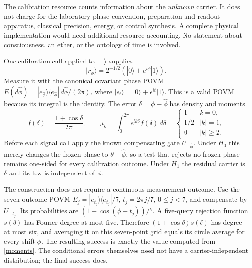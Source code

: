 \documentclass[11pt,a4paper]{article}
\newcommand{\ket}[1]{|#1\rangle}
\newcommand{\bra}[1]{\langle#1|}
\begin{document}
The calibration resource counts information about the \emph{unknown} carrier. It does not charge for the laboratory phase convention, preparation and readout apparatus, classical precision, energy, or control synthesis. A complete physical implementation would need additional resource accounting. No statement about consciousness, an ether, or the ontology of time is involved.

One calibration call applied to $\ket{+}$ supplies
\[
 \ket{r_\phi}=2^{-1/2}(\ket0+e^{i\phi}\ket1).
\]
Measure it with the canonical covariant phase POVM
$E(d\widehat\phi)=\ket{e_{\widehat\phi}}\bra{e_{\widehat\phi}}\,d\widehat\phi/(2\pi)$, where $\ket{e_t}=\ket0+e^{it}\ket1$.
This is a valid POVM because its integral is the identity. The error $\delta=\phi-\widehat\phi$ has density and moments
\begin{equation}\label{moments}
 f(\delta)=\frac{1+\cos\delta}{2\pi},\qquad
 \mu_k=\int_0^{2\pi}e^{ik\delta}f(\delta)\,d\delta
 =\begin{cases}1&k=0,\\1/2&|k|=1,\\0&|k|\geq2.\end{cases}
\end{equation}
Before each signal call apply the known compensating gate $U_{-\widehat\phi}$. Under $H_0$ this merely changes the frozen phase to $\theta-\widehat\phi$, so a test that rejects no frozen phase remains one-sided for every calibration outcome. Under $H_1$ the residual carrier is $\delta$ and its law is independent of $\phi$.

The construction does not require a continuous measurement outcome.
Use the seven-outcome POVM
$E_j=\ket{e_{t_j}}\bra{e_{t_j}}/7$, $t_j=2\pi j/7$, $0\leq j<7$,
and compensate by $U_{-t_j}$. Its probabilities are
$(1+\cos(\phi-t_j))/7$. A five-query rejection function $s(\delta)$
has Fourier degree at most five. Therefore
$(1+\cos\delta)s(\delta)$ has degree at most six, and averaging it
on this seven-point grid equals its circle average for every shift
$\phi$. The resulting success is exactly the value computed from
\eqref{moments}. The conditional errors themselves need not have a
carrier-independent distribution; the final success does.
\end{document}
